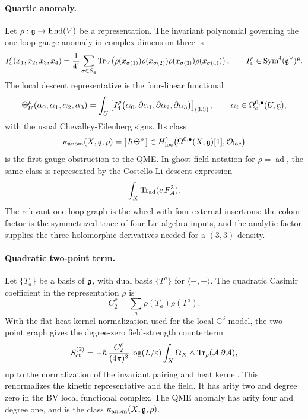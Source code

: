 \paragraph{Quartic anomaly.}
Let \(\rho:\mathfrak{g}\to\mathrm{End}(V)\) be a representation.  The invariant
polynomial governing the one-loop gauge anomaly in complex dimension
three is
\[
  I_4^\rho(x_1,x_2,x_3,x_4)
  =
  \frac1{4!}\sum_{\sigma\in S_4}
  \operatorname{Tr}_V\!\left(
    \rho(x_{\sigma(1)})\rho(x_{\sigma(2)})
    \rho(x_{\sigma(3)})\rho(x_{\sigma(4)})
  \right),
  \qquad
  I_4^\rho\in\mathrm{Sym}^4(\mathfrak{g}^\vee)^{\mathfrak{g}} .
\]
The local descent representative is the four-linear functional
\[
  \Theta_U^\rho(\alpha_0,\alpha_1,\alpha_2,\alpha_3)
  =
  \int_U
  \left[
  I_4^\rho\bigl(
    \alpha_0,\partial\alpha_1,\partial\alpha_2,\partial\alpha_3
  \bigr)
  \right]_{(3,3)},
  \qquad
  \alpha_i\in\Omega_c^{0,\bullet}(U,\mathfrak{g}),
\]
with the usual Chevalley-Eilenberg signs.  Its class
\[
  \kappa_{\mathrm{anom}}(X,\mathfrak{g},\rho)
  =
  [\,\hbar\,\Theta^\rho\,]
  \in
  H^1_{\mathrm{loc}}
  \bigl(\Omega^{0,\bullet}(X,\mathfrak{g})[1],\mathcal{O}_{\mathrm{loc}}\bigr)
\]
is the first gauge obstruction to the QME.  In ghost-field notation for
\(\rho=\operatorname{ad}\), the same class is represented by the
Costello-Li descent expression
\[
  \int_X \operatorname{Tr}_{\operatorname{ad}}(c\,F_{\mathcal{A}}^3).
\]
The relevant one-loop graph is the wheel with four external insertions:
the colour factor is the symmetrized trace of four Lie algebra inputs,
and the analytic factor supplies the three holomorphic derivatives
needed for a \((3,3)\)-density.

\paragraph{Quadratic two-point term.}
Let \(\{T_a\}\) be a basis of \(\mathfrak{g}\), with dual basis \(\{T^a\}\) for
\(\langle-,-\rangle\).  The quadratic Casimir coefficient in the
representation \(\rho\) is
\[
  C_2^\rho=\sum_a\rho(T_a)\rho(T^a).
\]
With the flat heat-kernel normalization used for the local
\(\mathbb C^3\) model, the two-point graph gives the degree-zero
field-strength counterterm
\[
  S_{\mathrm{ct}}^{(2)}
  =
  -\hbar\,\frac{C_2^\rho}{(4\pi)^3}\log(L/\varepsilon)
  \int_X\Omega_X\wedge\operatorname{Tr}_\rho(\mathcal{A}\,\bar{\partial}\mathcal{A}),
\]
up to the normalization of the invariant pairing and heat kernel.  This
renormalizes the kinetic representative and the field.  It has arity
two and degree zero in the BV local functional complex.  The QME anomaly
has arity four and degree one, and is the class \(\kappa_{\mathrm{anom}}(X,\mathfrak{g},\rho)\).

